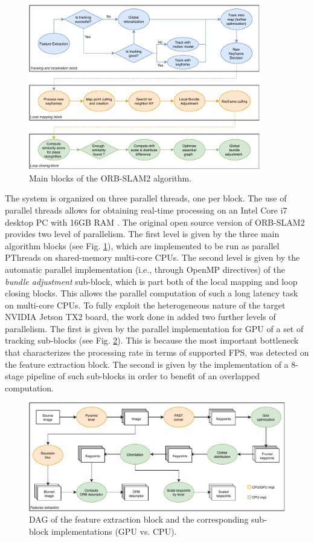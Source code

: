 \begin{figure}[tbp]
	\centering
	\includegraphics[width=0.90\textwidth]{images/orb-slam-overview2.pdf}
	\caption{Main blocks of the ORB-SLAM2 algorithm.}
	\label{fig:orbslam}
\end{figure}


The system is organized on three parallel threads, one per block. The use of parallel threads allows for obtaining real-time processing on an Intel Core i7 desktop PC with 16GB RAM \cite{murORB2}. The original open source version of ORB-SLAM2 provides two level of parallelism. The first level is given by the three main algorithm blocks (see Fig. \ref{fig:orbslam}), which are implemented to be run as parallel PThreads on shared-memory multi-core CPUs. The second level is given by the automatic parallel implementation (i.e., through OpenMP directives) of the \textit{bundle adjustment} sub-block, which is part both of the local mapping and loop closing blocks. This allows the parallel computation of such a long latency task on multi-core CPUs.
To fully exploit the heterogeneous nature of the target NVIDIA Jetson TX2 board, the work done in \cite{iros2019} added two further levels of parallelism. The first is given by the parallel implementation for GPU of a set of tracking sub-blocks (see Fig. \ref{FIG:FE-DAG}). This is because the most important bottleneck that characterizes the processing rate in terms of supported FPS, was detected on the feature extraction block. The second is given by the implementation of a 8-stage pipeline of such sub-blocks in order to benefit of an overlapped computation.

\begin{figure}[t!]
	\centering
	\includegraphics[width=\linewidth]{images/orb-feature.pdf}
	\caption{DAG of the feature extraction block and the corresponding sub-block implementations (GPU vs. CPU).}\label{FIG:FE-DAG}
\end{figure}


